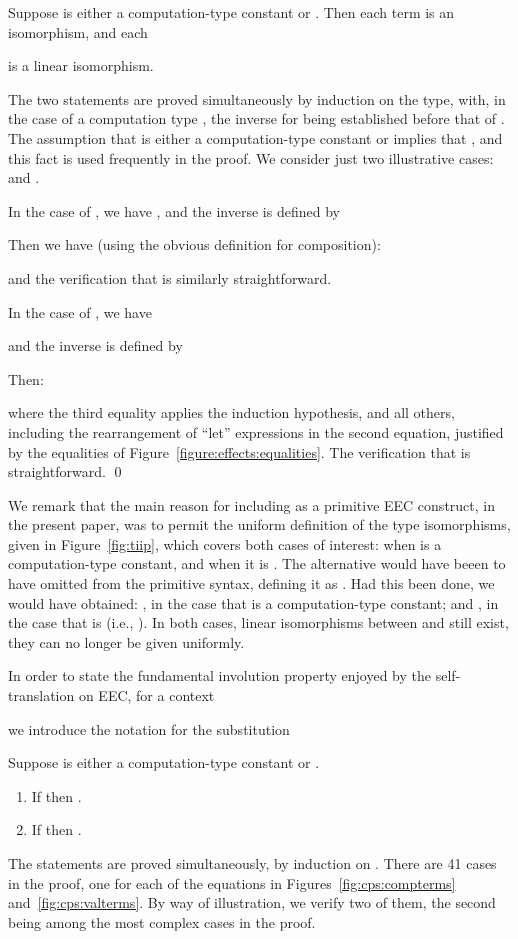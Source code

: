 \documentclass{LMCS}
\begin{document}
\begin{lem}
Suppose  is either a computation-type constant or . Then
each term  is an isomorphism, and each

is a linear isomorphism.
\end{lem}

\proof
The two statements are proved simultaneously by induction on the type,
with, in the case of a computation type , the inverse
for  being established before that of .
The assumption that  is either a computation-type constant or  implies
that , and this fact is used frequently
in the proof. We consider just two illustrative cases:
 and .

In the case of  , we have ,
and the inverse  is defined 
by

Then we have (using the obvious definition for composition):

and the verification that 
 is similarly straightforward.

In the case of  , we have 

and the inverse 
is defined by

Then:

where the third equality applies the induction hypothesis, and all others,
including the rearrangement of ``let'' expressions in the second equation, justified 
by the equalities of 
Figure~\ref{figure:effects:equalities}.
The verification that 
 is 
straightforward.
\qed

We remark that the main reason for including   as a primitive EEC construct, in the present paper,
was to permit the  uniform definition of the type isomorphisms, given in Figure~\ref{fig:tiip},
which covers both  cases of interest: when  is a computation-type constant, and when it is
. The alternative would have beeen to have omitted  from the primitive syntax, 
defining it as . Had this been done, 
we would have  obtained: , in the case that  is
a computation-type constant; and , in the case that
 is  (i.e., ). In both cases, 
linear isomorphisms between  and  still exist, 
they can no longer be given uniformly.


In order to state the fundamental involution property enjoyed
by the self-translation on EEC, for a context

we introduce the notation  for the substitution


\begin{thm}
\label{theorem:involution}
Suppose  is either a computation-type constant or .
\begin{enumerate}[\em(1)]
\item \label{inv:i}
\label{item:Vnat} If  then
.

\item \label{inv:ii} If  then
.
\end{enumerate}
\end{thm}
\proof
The statements are proved simultaneously, by induction on . There are 41 cases in the
proof, one for each of the equations in Figures~\ref{fig:cps:compterms} 
and~\ref{fig:cps:valterms}. By way of illustration,
we verify two of them, the second being among the most complex cases in the proof.
\end{document}
